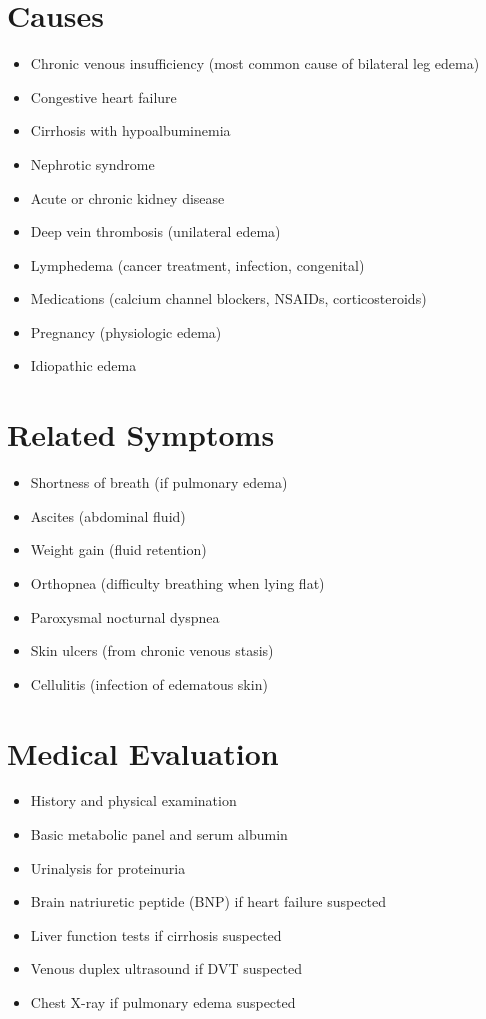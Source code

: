 \section*{Causes}
\begin{itemize}
\item Chronic venous insufficiency (most common cause of bilateral leg edema)
\item Congestive heart failure
\item Cirrhosis with hypoalbuminemia
\item Nephrotic syndrome
\item Acute or chronic kidney disease
\item Deep vein thrombosis (unilateral edema)
\item Lymphedema (cancer treatment, infection, congenital)
\item Medications (calcium channel blockers, NSAIDs, corticosteroids)
\item Pregnancy (physiologic edema)
\item Idiopathic edema
\end{itemize}

\section*{Related Symptoms}
\begin{itemize}
\item Shortness of breath (if pulmonary edema)
\item Ascites (abdominal fluid)
\item Weight gain (fluid retention)
\item Orthopnea (difficulty breathing when lying flat)
\item Paroxysmal nocturnal dyspnea
\item Skin ulcers (from chronic venous stasis)
\item Cellulitis (infection of edematous skin)
\end{itemize}

\section*{Medical Evaluation}
\begin{itemize}
\item History and physical examination
\item Basic metabolic panel and serum albumin
\item Urinalysis for proteinuria
\item Brain natriuretic peptide (BNP) if heart failure suspected
\item Liver function tests if cirrhosis suspected
\item Venous duplex ultrasound if DVT suspected
\item Chest X-ray if pulmonary edema suspected
\end{itemize}

